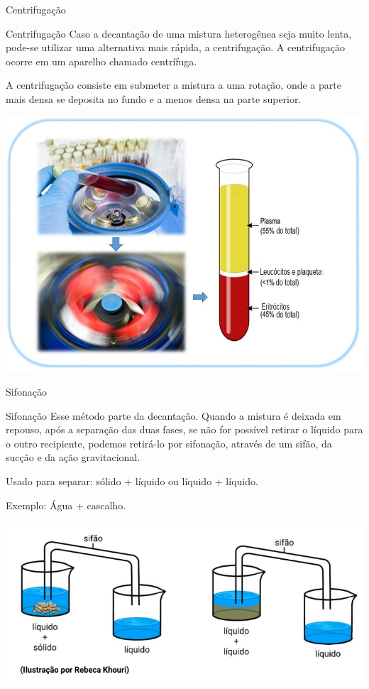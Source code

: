 \documentclass{beamer}
\begin{document}
\begin{frame}[label={sec:org0e7f115}]{Centrifugação}
\begin{block}{Centrifugação}
Caso a decantação de uma mistura heterogênea seja muito lenta, pode-se utilizar uma alternativa mais rápida, a centrifugação. A centrifugação ocorre em um aparelho chamado \alert{centrífuga}.

A centrifugação consiste em submeter a mistura a uma rotação, onde a parte mais densa se deposita no fundo e a menos densa na parte superior.

\begin{center}
\includegraphics[scale=0.3]{../img/centrifugacao.jpg}
\end{center}
\end{block}
\end{frame}
\begin{frame}[label={sec:orge3c27ca}]{Sifonação}
\begin{block}{Sifonação}
Esse método parte da decantação. Quando a mistura é deixada em repouso, após a separação das duas fases, se não for possível retirar o líquido para o outro recipiente, podemos retirá-lo por sifonação, através de um sifão, da sucção e da ação gravitacional.

Usado para separar: \alert{sólido + líquido} ou \alert{líquido + líquido}.

Exemplo: Água + cascalho.

\begin{center}
\includegraphics[scale=0.6]{../img/sifonacao.png}
\end{center}
\end{block}
\end{frame}
\end{document}
